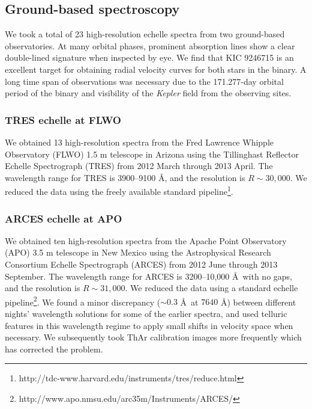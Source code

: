 \subsection{Ground-based spectroscopy}\label{spectra}
We took a total of 23 high-resolution echelle spectra from two ground-based observatories. At many orbital phases, prominent absorption lines show a clear double-lined signature when inspected by eye. We find that KIC 9246715 is an excellent target for obtaining radial velocity curves for both stars in the binary. A long time span of observations was necessary due to the 171.277-day orbital period of the binary and visibility of the \emph{Kepler} field from the observing sites.

\subsubsection{TRES echelle at FLWO}\label{tres}
We obtained 13 high-resolution spectra from the Fred Lawrence Whipple Observatory (FLWO) 1.5 m telescope in Arizona using the Tillinghast Reflector Echelle Spectrograph (TRES) from 2012 March through 2013 April. The wavelength range for TRES is 3900--9100 \AA, and the resolution is $R \sim 30,000$. We reduced the data using the freely available standard pipeline\footnote{http://tdc-www.harvard.edu/instruments/tres/reduce.html}.

\subsubsection{ARCES echelle at APO}\label{arces}
We obtained ten high-resolution spectra from the Apache Point Observatory (APO) 3.5 m telescope in New Mexico using the Astrophysical Research Consortium Echelle Spectrograph (ARCES) from 2012 June through 2013 September. The wavelength range for ARCES is 3200--10,000 \AA \ with no gaps, and the resolution is $R \sim 31,000$. We reduced the data using a standard echelle pipeline\footnote{http://www.apo.nmsu.edu/arc35m/Instruments/ARCES/}. We found a minor discrepancy ($\sim 0.3$ \AA \ at $7640$ \AA) between different nights' wavelength solutions for some of the earlier spectra, and used telluric features in this wavelength regime to apply small shifts in velocity space when necessary. We subsequently took ThAr calibration images more frequently which has corrected the problem.
